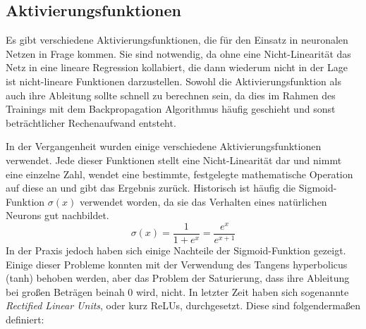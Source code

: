 \subsection{Aktivierungsfunktionen}
\label{sec:activationfuncs}
Es gibt verschiedene Aktivierungsfunktionen, die für den Einsatz in neuronalen Netzen in Frage kommen.
Sie sind notwendig, da ohne eine Nicht-Linearität das Netz in eine lineare Regression kollabiert, 
die dann wiederum nicht in der Lage ist nicht-lineare Funktionen darzustellen.
Sowohl die Aktivierungsfunktion als auch ihre Ableitung sollte schnell zu berechnen sein, 
da dies im Rahmen des Trainings mit dem Backpropagation Algorithmus häufig geschieht 
und sonst beträchtlicher Rechenaufwand entsteht.

In der Vergangenheit wurden einige verschiedene Aktivierungsfunktionen verwendet.
Jede dieser Funktionen stellt eine Nicht-Linearität dar und nimmt eine einzelne Zahl, wendet eine bestimmte, festgelegte mathematische 
Operation auf diese an und gibt das Ergebnis zurück.
Historisch ist häufig die Sigmoid-Funktion \(\sigma(x)\) verwendet worden, da sie das Verhalten eines natürlichen Neurons gut nachbildet.
\begin{equation}
	\sigma(x) = \frac{1}{1 + e^x} = \frac{e^x}{e^{x + 1}}
	\label{func:Sigmoid}
\end{equation}
In der Praxis jedoch haben sich einige Nachteile der Sigmoid-Funktion gezeigt.
Einige dieser Probleme konnten mit der Verwendung des Tangens hyperbolicus (tanh) behoben werden, 
aber das Problem der Saturierung, dass ihre Ableitung bei großen Beträgen beinah \(0\) wird, nicht.
In letzter Zeit haben sich sogenannte \textit{Rectified Linear Units}, oder kurz ReLUs, durchgesetzt.
Diese sind folgendermaßen definiert:
% 
	
	
